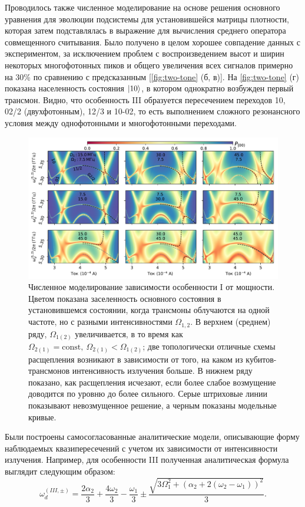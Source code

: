 \documentclass[14pt, a4paper]{extarticle}
\DeclarePairedDelimiter\ket{\lvert}{\rangle}
\begin{document}
Проводилось также численное моделирование на основе решения основного уравнения для эволюции подсистемы для установившейся матрицы плотности, которая затем подставлялась в выражение для вычисления среднего оператора совмещенного считывания. Было получено в целом хорошее совпадение данных с экспериментом, за исключением проблем с воспроизведением высот и ширин некоторых многофотонных пиков и общего увеличения всех сигналов примерно на 30\% по сравнению с предсказанным [\autoref{fig:two-tone} (б, в)]. На \autoref{fig:two-tone} (г) показана населенность состояния $\ket{10}$, в котором однократно возбужден первый трансмон. Видно, что особенность III образуется пересечением переходов 10, 02/2 (двухфотонным), 12/3 и 10-02, то есть выполнением сложного резонансного условия между однофотонными и многофотонными переходами.
	

\begin{figure}[t]
	\includegraphics[width=1\linewidth]{Pictures/topological_splittings}
	\caption{Численное моделирование зависимости особенности I от мощности. Цветом показана заселенность основного состояния в установившемся состоянии, когда трансмоны облучаются на одной частоте, но с разными интенсивностями $\Omega_{1,2}$. В верхнем (среднем) ряду, 
		$\Omega_{1(2)}$ увеличивается, в то время как
		$\Omega_{2(1)} = \text{const},\ \Omega_{2(1)} < 
		\Omega_{1(2)}$; две топологически отличные схемы расщепления возникают в зависимости от того, на каком из кубитов\hyp трансмонов интенсивность излучения больше. В нижнем ряду показано, как расщепления исчезают, если более слабое возмущение доводится по уровню до более сильного. Серые штриховые линии показывают невозмущенное решение, а черным показаны модельные кривые.}
	\label{fig:topologicalsplittings}
\end{figure}

Были построены самосогласованные аналитические модели, описывающие форму наблюдаемых квазипересечений с учетом их зависимости от интенсивности излучения. Например, для особенности III полученная аналитическая формула выглядит следующим образом:
\begin{equation}
\omega_d^{(III, \pm)} = \frac{2 \alpha_2}{3} + \frac{4 \omega_{2}}{3} - \frac{\omega_{1}}{3} \pm \frac{\sqrt{3 \Omega_{1}^{2} + \left( \alpha_2 + 2 (\omega_{2} - \omega_{1})\right)^{2}}}{3}.
\label{eq:splitting_model}
\end{equation}
\end{document}
